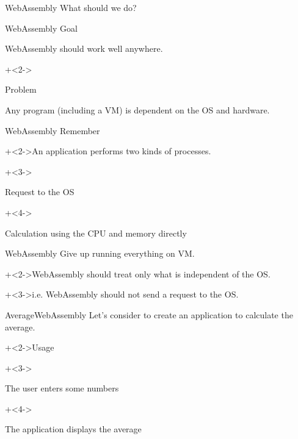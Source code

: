 \begin{frame}{WebAssembly}{}
    What should we do?
\end{frame}


\begin{frame}{WebAssembly}{}
    Goal
    \vspace{2ex}

    WebAssembly should work well anywhere.
    \vspace{4ex}

    \onslide+<2->{
        Problem
        \vspace{2ex}

        Any program (including a VM) is dependent on the OS and hardware.
    }
\end{frame}


\begin{frame}{WebAssembly}{}
    Remember
    \vspace{2ex}

    \onslide+<2->{An application performs two kinds of processes.}
    \vspace{4ex}

    \begin{itemize}
        \onslide+<3->{\item Request to the OS}
        \onslide+<4->{\item Calculation using the CPU and memory directly}
    \end{itemize}
\end{frame}


\begin{frame}{WebAssembly}{}
    Give up running everything on VM.
    \vspace{4ex}

    \onslide+<2->{WebAssembly should treat only what is independent of the OS.}
    \vspace{4ex}

    \onslide+<3->{i.e. WebAssembly should not send a request to the OS.}
\end{frame}


\begin{frame}{Average}{WebAssembly}
    Let's consider to create an application to calculate the average.
    \vspace{4ex}

    \onslide+<2->{Usage}
    \vspace{2ex}

    \begin{enumerate}
        \onslide+<3->{\item The user enters some numbers}
        \onslide+<4->{\item The application displays the average}
    \end{enumerate}
\end{frame}


